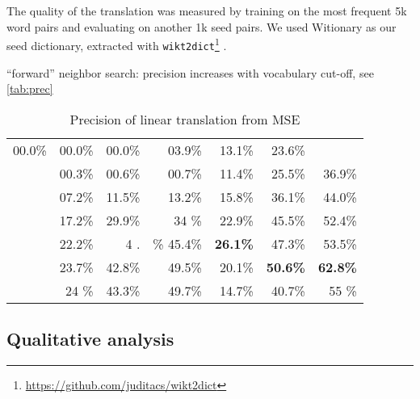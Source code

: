 \documentclass[11pt]{article}
\begin{document}
The quality of the translation was measured by training on the most frequent 5k
word pairs and evaluating on another 1k seed pairs.  We used Witionary as our
seed dictionary, extracted with
\texttt{wikt2dict}\footnote{\url{https://github.com/juditacs/wikt2dict}}
\citep{Acs:2016}. 

``forward'' neighbor search: precision increases with vocabulary cut-off, see
\autoref{tab:prec}

\begin{table}
  \begin{tabular}{c|rrr|rrr}
    \toprule
    \\
    \midrule
    00.0\% & 00.0\% & 00.0\% & 03.9\% & 13.1\% & 23.6\% & \\ &
    00.3\% & 00.6\% & 00.7\% & 11.4\% & 25.5\% & 36.9\% & \\ &
    07.2\% & 11.5\% & 13.2\% & 15.8\% & 36.1\% & 44.0\% & \\ &
    17.2\% & 29.9\% & 34 \%& 22.9\% & 45.5\% & 52.4\% & \\ &
    22.2\% & 4 .&\% 45.4\% & \textbf{26.1\%} & 47.3\% & 53.5\% & \\ &
    23.7\% & 42.8\% & 49.5\% & 20.1\% & \textbf{50.6\%} & \textbf{62.8\%} & \\ &
    24 \%& 43.3\% & 49.7\% & 14.7\% & 40.7\% & 55 \%& \\
    \bottomrule
\end{tabular}
  \caption{Precision of linear translation from MSE}
  \label{tab:prec}
\end{table}

\subsection{Qualitative analysis}
\end{document}
